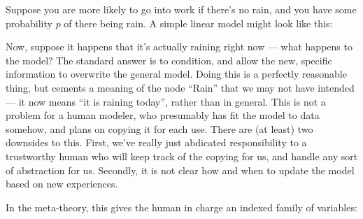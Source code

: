 \documentclass{article}
\begin{document}
	\begin{example}
		Suppose you are more likely to go into work if there's no rain, and you have some probability $p$ of there being rain. A simple linear model might look like this:
		
		\begin{center}
		\end{center}
		
		Now, suppose it happens that it's actually raining right now --- what happens to the model? The standard answer is to condition, and allow the new, specific information to overwrite the general model. Doing this is a perfectly reasonable thing, but cements a meaning of the node ``Rain'' that we may not have intended --- it now means ``it is raining today'', rather than in general. This is not a problem for a human modeler, who presumably has fit the model to data somehow, and plans on copying it for each use. There are (at least) two downsides to this. First, we've really just abdicated responsibility to a trustworthy human who will keep track of the copying for us, and handle any sort of abstraction for us. Secondly, it is not clear how and when to update the model based on new experiences.
		
		In the meta-theory, this gives the human in charge an indexed family of variables:
		

\end{example}
\end{document}
